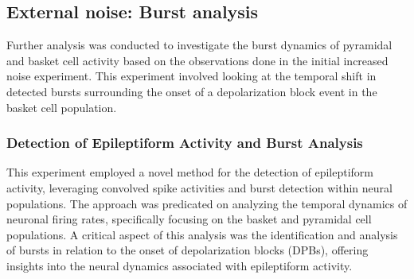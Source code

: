 \subsection{External noise: Burst analysis}
Further analysis was conducted to investigate the burst dynamics of pyramidal
and basket cell activity based on the observations done in the initial
increased noise experiment. This experiment involved looking at the temporal
shift in detected bursts surrounding the onset of a depolarization block event
in the basket cell population.

\subsubsection{Detection of Epileptiform Activity and Burst Analysis}
This experiment employed a novel method for the detection of epileptiform
activity, leveraging convolved spike activities and burst detection within
neural populations. The approach was predicated on analyzing the temporal
dynamics of neuronal firing rates, specifically focusing on the basket and
pyramidal cell populations. A critical aspect of this analysis was the
identification and analysis of bursts in relation to the onset of
depolarization blocks (DPBs), offering insights into the neural dynamics
associated with epileptiform activity.

